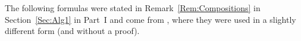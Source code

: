 \documentclass[\MainFolder/Text.tex]{subfiles}
\begin{document}
The following formulas were stated in Remark~\ref{Rem:Compositions} in Section~\ref{Sec:Alg1} in Part~I and come from \cite{Cieliebak2015}, where they were used in a slightly different form (and without a proof).
%
%
%
%
%
%
%
\end{document}
